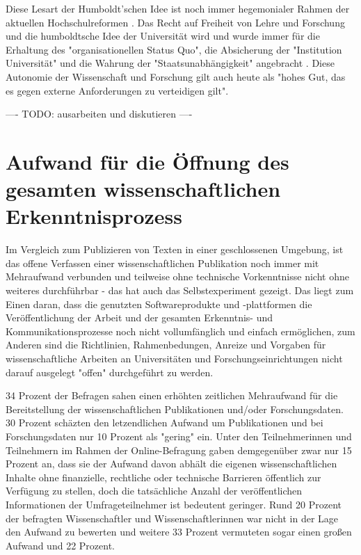 Diese Lesart der Humboldt’schen Idee ist noch immer hegemonialer Rahmen der aktuellen Hochschulreformen \cite{Huber_2005}. Das Recht auf Freiheit von Lehre und Forschung und die humboldtsche Idee der Universität wird und wurde immer für die Erhaltung des "organisationellen Status Quo", die Absicherung der "Institution Universität" und die Wahrung der "Staatsunabhängigkeit" angebracht \cite{Huber_2005}. Diese Autonomie der Wissenschaft und Forschung gilt auch heute als "hohes Gut, das es gegen externe Anforderungen zu verteidigen gilt"\cite{kaldewey_2010}.

---- TODO: ausarbeiten und diskutieren ----

\section{Aufwand für die Öffnung des gesamten wissenschaftlichen Erkenntnisprozess}

Im Vergleich zum Publizieren von Texten in einer geschlossenen Umgebung, ist das offene Verfassen einer wissenschaftlichen Publikation noch immer mit Mehraufwand verbunden und teilweise ohne technische Vorkenntnisse nicht ohne weiteres durchführbar - das hat auch das Selbstexperiment gezeigt. Das liegt zum Einen daran, dass die genutzten Softwareprodukte und -plattformen die Veröffentlichung der Arbeit und der gesamten Erkenntnis- und Kommunikationsprozesse noch nicht vollumfänglich und einfach ermöglichen, zum Anderen sind die Richtlinien, Rahmenbedungen, Anreize und Vorgaben für wissenschaftliche Arbeiten an Universitäten und Forschungseinrichtungen nicht darauf ausgelegt "offen" durchgeführt zu werden.

34 Prozent der Befragen sahen einen erhöhten zeitlichen Mehraufwand für die Bereitstellung der wissenschaftlichen Publikationen und/oder Forschungsdaten. 30 Prozent schäzten den letzendlichen Aufwand um Publikationen und bei Forschungsdaten nur 10 Prozent als "gering" ein. Unter den Teilnehmerinnen und Teilnehmern im Rahmen der Online-Befragung gaben demgegenüber zwar nur 15 Prozent an, dass sie der Aufwand davon abhält die eigenen wissenschaftlichen Inhalte ohne finanzielle, rechtliche oder technische Barrieren öffentlich zur Verfügung zu stellen, doch die tatsächliche Anzahl der veröffentlichen Informationen der Umfrageteilnehmer ist bedeutent geringer. Rund 20 Prozent der befragten Wissenschaftler und Wissenschaftlerinnen war nicht in der Lage den Aufwand zu bewerten und weitere 33 Prozent vermuteten sogar einen großen Aufwand  und 22 Prozent.

